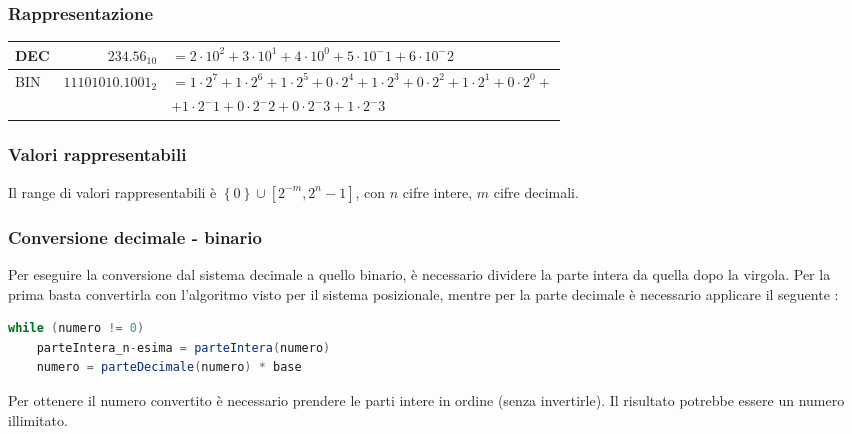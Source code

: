 \documentclass{article}
\begin{document}
\subsubsection*{Rappresentazione}
\begin{center}
	\begin{tabularx}{\textwidth}{l r X}
		DEC & \(234.56_{10}\) & \(= 2 \cdot 10 ^ 2 + 3 \cdot 10 ^ 1 + 4 \cdot 10 ^ 0 + 5 \cdot 10 ^ -1 + 6 \cdot 10 ^ -2\) \\
		\midrule
		\multirow{2}{*}{BIN} & \multirow{2}{*}{\(11101010.1001_2\)} & \(= 1 \cdot 2 ^ 7 + 1 \cdot 2 ^ 6 + 1 \cdot 2 ^ 5 + 0 \cdot 2 ^ 4 + 1 \cdot 2 ^ 3 + 0 \cdot 2 ^ 2 + 1 \cdot 2 ^ 1 + 0 \cdot 2 ^ 0 +\) \\
		& & \(+ 1 \cdot 2 ^ -1 + 0 \cdot 2 ^ -2 + 0 \cdot 2 ^ -3 + 1 \cdot 2 ^ -3\)
	\end{tabularx}
\end{center}

\subsubsection*{Valori rappresentabili}
Il range di valori rappresentabili è \(\left\{0\right\} \cup \left[ 2^{-m}, 2^n - 1 \right]\), con \(n\) cifre intere, \(m\) cifre decimali.

\subsubsection*{Conversione decimale - binario}
Per eseguire la conversione dal sistema decimale a quello binario, è necessario dividere la parte intera da quella dopo
la virgola. Per la prima basta convertirla con l'algoritmo visto per il sistema posizionale, mentre per la parte decimale
è necessario applicare il seguente :
\begin{lstlisting}[language=Java]
while (numero != 0)
	parteIntera_n-esima = parteIntera(numero)
	numero = parteDecimale(numero) * base
\end{lstlisting}
Per ottenere il numero convertito è necessario prendere le parti intere in ordine (senza invertirle). Il risultato potrebbe
essere un numero illimitato.
\end{document}
